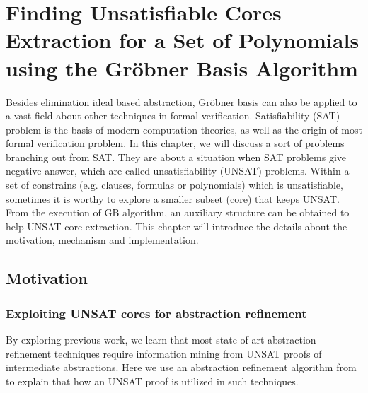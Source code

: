 \chapter{Finding Unsatisfiable Cores Extraction for a Set of Polynomials using the Gr\"obner Basis Algorithm}
\label{ch:UNSAT}
Besides elimination ideal based abstraction, Gr\"obner basis can also be applied to a vast field
about other techniques in formal verification. Satisfiability (SAT) problem is the basis of modern 
computation theories, as well as the origin of most formal verification problem. 
In this chapter, we will discuss a sort of problems branching out from SAT. They are about a situation 
when SAT problems give negative answer, which are called unsatisfiability (UNSAT) problems. Within 
a set of constrains (e.g. clauses, formulas or polynomials) which is unsatisfiable, sometimes 
it is worthy to explore a smaller subset (core) that keeps UNSAT. From the execution of GB algorithm, 
an auxiliary structure can be obtained to help UNSAT core extraction. This chapter will introduce the 
details about the motivation, mechanism and implementation. 

\section{Motivation}
\subsection{Exploiting UNSAT cores for abstraction refinement}
By exploring previous work, we learn that most state-of-art abstraction refinement techniques require 
information mining from UNSAT proofs of intermediate abstractions. 
Here we use an abstraction refinement algorithm from \cite{zhang2005design} to explain that how an UNSAT proof is
utilized in such techniques.

